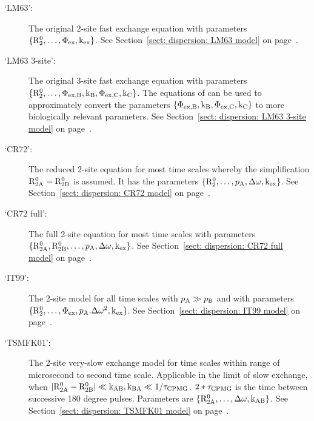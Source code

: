 \begin{description}
\item[`LM63':]  The original \citet{LuzMeiboom63} 2-site fast exchange equation with parameters $\{\mathrm{R}_2^0, \dots, \Phi_\textrm{ex}, \textrm{k}_\textrm{ex}\}$.  See Section~\ref{sect: dispersion: LM63 model} on page~\pageref{sect: dispersion: LM63 model}.
\item[`LM63 3-site':]  The original \citet{LuzMeiboom63} 3-site fast exchange equation with parameters $\{\mathrm{R}_2^0, \dots, \Phi_\textrm{ex,B}, \textrm{k}_\textrm{B}, \Phi_\textrm{ex,C}, \textrm{k}_\textrm{C}\}$.  The equations of \citet{OConnell09} can be used to approximately convert the parameters $\{\Phi_\textrm{ex,B}, \textrm{k}_\textrm{B}, \Phi_\textrm{ex,C}, \textrm{k}_\textrm{C}\}$ to more biologically relevant parameters.  See Section~\ref{sect: dispersion: LM63 3-site model} on page~\pageref{sect: dispersion: LM63 3-site model}.
\item[`CR72':]  The reduced \citet{CarverRichards72} 2-site equation for most time scales whereby the simplification $\mathrm{R}_\mathrm{2A}^0 = \mathrm{R}_\mathrm{2B}^0$ is assumed.  It has the parameters $\{\mathrm{R}_2^0, \dots, p_\textrm{A}, \Delta\omega, \textrm{k}_\textrm{ex}\}$.  See Section~\ref{sect: dispersion: CR72 model} on page~\pageref{sect: dispersion: CR72 model}.
\item[`CR72 full':]  The full \citet{CarverRichards72} 2-site equation for most time scales with parameters $\{\mathrm{R}_\mathrm{2A}^0, \mathrm{R}_\mathrm{2B}^0, \dots, p_\textrm{A}, \Delta\omega, \textrm{k}_\textrm{ex}\}$.  See Section~\ref{sect: dispersion: CR72 full model} on page~\pageref{sect: dispersion: CR72 full model}.
\item[`IT99':]  The \citet{IshimaTorchia99} 2-site model for all time scales with $p_\textrm{A} \gg p_\textrm{B}$ and with parameters $\{\mathrm{R}_2^0, \dots, \Phi_\textrm{ex}, p_\textrm{A}.\Delta\omega^2, \textrm{k}_\textrm{ex}\}$.  See Section~\ref{sect: dispersion: IT99 model} on page~\pageref{sect: dispersion: IT99 model}.
\item[`TSMFK01':]  The \citet{Tollinger01}  2-site very-slow exchange model for time scales within range of microsecond to second time scale.
Applicable in the limit of slow exchange, when $|\mathrm{R}_\mathrm{2A}^0 - \mathrm{R}_\mathrm{2B}^0| \ll \textrm{k}_\textrm{AB}, \textrm{k}_\textrm{BA} \ll 1/\tau_\textrm{CPMG}$.  $2*\tau_\textrm{CPMG}$ is the time between successive 180 degree pulses. Parameters are $\{\mathrm{R}_\mathrm{2A}^0, \dots, \Delta\omega, \textrm{k}_\textrm{AB}\}$.  See Section~\ref{sect: dispersion: TSMFK01 model} on page~\pageref{sect: dispersion: TSMFK01 model}.
\end{description}

